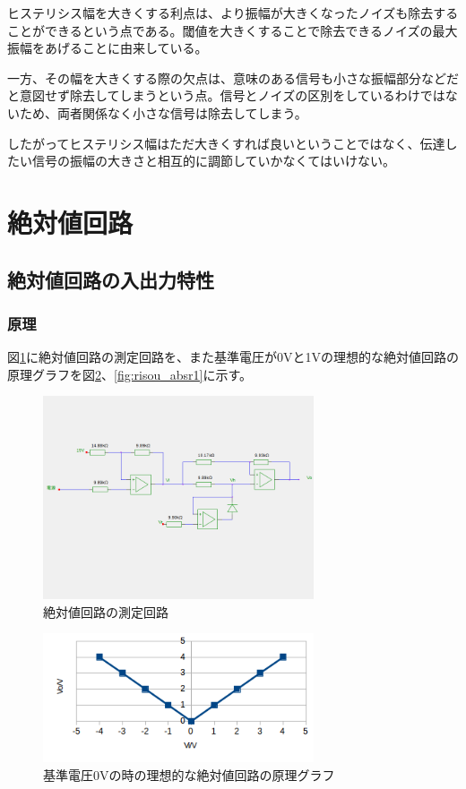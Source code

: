 \documentclass[11pt,a4j]{jsarticle}
\begin{document}
    ヒステリシス幅を大きくする利点は、より振幅が大きくなったノイズも除去することができるという点である。閾値を大きくすることで除去できるノイズの最大振幅をあげることに由来している。
    
    一方、その幅を大きくする際の欠点は、意味のある信号も小さな振幅部分などだと意図せず除去してしまうという点。信号とノイズの区別をしているわけではないため、両者関係なく小さな信号は除去してしまう。
    
    したがってヒステリシス幅はただ大きくすれば良いということではなく、伝達したい信号の振幅の大きさと相互的に調節していかなくてはいけない。
    
    
    \clearpage
    
 \section{絶対値回路}
  \subsection{絶対値回路の入出力特性}
   \subsubsection{原理}
    
    図\ref{fig:abs_tokusei}に絶対値回路の測定回路を、また基準電圧が0Vと1Vの理想的な絶対値回路の原理グラフを図\ref{fig:risou_absr0}、\ref{fig:risou_absr1}に示す。
    
    \begin{figure}[htbp]
  \centering
  \includegraphics[width=8cm,clip]{abs_tokusei.png}
  \caption{絶対値回路の測定回路}
  \label{fig:abs_tokusei}
 \end{figure}%
    
    \begin{figure}[htbp]
  \centering
  \includegraphics[width=8cm,clip]{risou_absr0.png}
  \caption{基準電圧0Vの時の理想的な絶対値回路の原理グラフ}
  \label{fig:risou_absr0}
 \end{figure}
    
\end{document}
